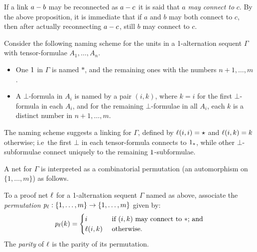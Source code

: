 \documentclass[conference]{IEEEtran}
\begin{document}
%


If a link $a-b$ may be reconnected as $a-c$ it is said that $a$ \emph{may connect to} $c$. 
%
By the above proposition, it is immediate that if $a$ and $b$ may both connect to $c$, then after actually reconnecting $a-c$, still $b$ may connect to $c$.



Consider the following naming scheme for the units in a 1-alternation sequent $\Gamma$ with tensor-formulae $A_1,\dotsc,A_n$.
%
\begin{itemize}

	\item
One $1$ in $\Gamma$ is named $*$, and the remaining ones with the numbers $n+1,\dotsc,m$.

	\item
A $\bot$-formula in $A_i$ is named by a pair $(i,k)$, where $k=i$ for the first $\bot$-formula in each $A_i$, and for the remaining $\bot$-formulae in all $A_i$, each $k$ is a distinct number in $n+1,\dotsc,m$.

\end{itemize}
%
The naming scheme suggests a linking for $\Gamma$, defined by $\ell(i,i)=\star$ and $\ell(i,k)=k$ otherwise; i.e\ the first $\bot$ in each tensor-formula connects to $1_{*}$, while other $\bot$-subformulae connect uniquely to the remaining $1$-subformulae.



A net for $\Gamma$ is interpreted as a combinatorial permutation (an automorphism on $\{1,\dotsc,m\}$) as follows.
%
\begin{definition}
\label{def:combinatorial permutation}
To a proof net $\ell$ for a 1-alternation sequent $\Gamma$ named as above, associate the \emph{permutation} $\mathit p_{\ell}:\{1,\dotsc,m\}\to\{1,\dotsc,m\}$ given by:
\[
	\mathit p_{\ell}(k) = 
	\begin{cases}
		i				& \text{ if $(i,k)$ may connect to $*$; and}
	\\	\ell(i,k)		& \text{ otherwise.}
	\end{cases}
\]
The \emph{parity} of $\ell$ is the parity of its permutation.
\end{definition}
\end{document}
